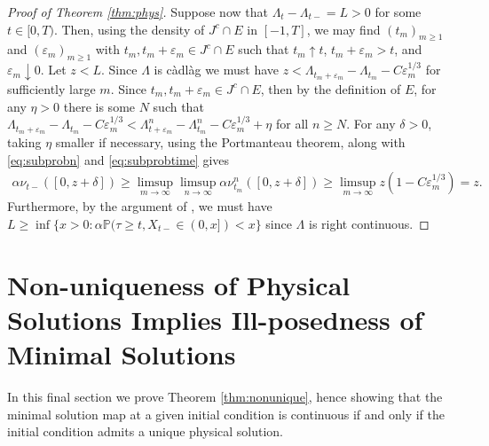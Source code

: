 \documentclass[12pt]{amsart}
\newcommand{\veps}{\varepsilon}
\newcommand{\bP}{\mathbb{P}}
\theoremstyle{plain}
\theoremstyle{definition}
\begin{document}
\begin{proof}[Proof of Theorem \ref{thm:phys}]
\medskip

Suppose now that $\Lambda_t-\Lambda_{t-}=L>0$ for some $t\in[0,T)$. Then, using the density of $J^c\cap E$ in $[-1,T]$, we may find $(t_m)_{m\ge 1}$ and $(\veps_m)_{m\ge 1}$ with $t_m,t_m+\veps_m\in J^c\cap E$ such that $t_m\uparrow t$, $t_m+\veps_m>t$, and $\veps_m\downarrow 0$. Let $z<L$. Since $\Lambda$ is c\`adl\`ag we must have $z<\Lambda_{t_m+\veps_m}-\Lambda_{t_m}-C\veps_m^{1/3}$ for sufficiently large $m$. Since $t_m,t_m+\veps_m\in J^c\cap E$, then by the definition of $E$, for any $\eta>0$ there is some $N$ such that $\Lambda_{t_m+\veps_m}-\Lambda_{t_m}-C\veps_m^{1/3}<\Lambda^n_{t+\veps_m}-\Lambda^n_{t_m}-C\veps_m^{1/3}+\eta$ for all $n\ge N$. For any $\delta>0$, taking $\eta$ smaller if necessary, using the Portmanteau theorem, along with \eqref{eq:subprobn} and \eqref{eq:subprobtime} gives
\begin{align}
\alpha\nu_{t-}([0, z+\delta])\ge \limsup_{m\to\infty}\limsup_{n\to\infty} \alpha\nu_{t_m}^n([0, z+\delta])\ge \limsup_{m\to\infty} z(1-C\veps_m^{1/3})=z.
\end{align}
Furthermore, by the argument of \cite[Proof of
Proposition 1.2]{hambly_mckean--vlasov_2018}, we must have $L\ge \inf\{x>0:\alpha\bP(\tau\ge t, X_{t-}\in(0,x])<x\}$ since $\Lambda$ is right continuous.  
\end{proof}

\section{Non-uniqueness of Physical Solutions Implies Ill-posedness of Minimal Solutions}\label{sec:nonunique}

In this final section we prove Theorem \ref{thm:nonunique}, hence showing that the minimal solution map at a given initial condition is continuous if and only if the initial condition admits a unique physical solution.
\end{document}
